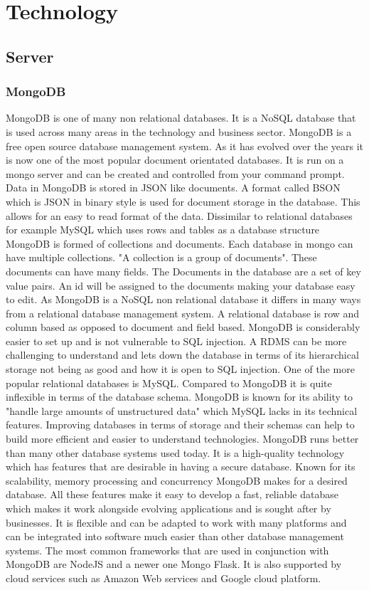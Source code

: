 \section{Technology}
\subsection{Server}
\subsubsection{MongoDB}
MongoDB is one of many non relational databases. It is a NoSQL database that is used across many areas in the technology and business sector. MongoDB is a free open source database management system. As it has evolved over the years it is now one of the most popular document orientated databases. It is run on a mongo server and can be created and controlled from your command prompt. Data in MongoDB is stored in JSON like documents. A format called BSON which is JSON in binary style is used for document storage in the database.\cite{MongoDB} This allows for an easy to read format of the data. Dissimilar to relational databases for example MySQL which uses rows and tables as a database structure MongoDB is formed of collections and documents. Each database in mongo can have multiple collections. "A collection is a group of documents".\cite{MongoDBColections} These documents can have many fields. The Documents in the database are a set of key value pairs. An id will be assigned to the documents making your database easy to edit. As MongoDB is a NoSQL non relational database it differs in many ways from a relational database management system. A relational database is row and column based as opposed to document and field based.\cite{MongoDBColections} MongoDB is considerably easier to set up and is not vulnerable to SQL injection. A RDMS can be more challenging to understand and lets down the database in terms of its hierarchical storage not being as good and how it is open to SQL injection. One of the more popular relational databases is MySQL. Compared to MongoDB it is quite inflexible in terms of the database schema. \cite{MongoDB} MongoDB is known for its ability to "handle large amounts of unstructured data" which MySQL lacks in its technical features. \cite{MongoVsMysql} Improving databases in terms of storage and their schemas can help to build more efficient and easier to understand technologies. MongoDB runs better than many other database systems used today. It is a high-quality technology which has features that are desirable in having a secure database. Known for its scalability, memory processing and concurrency MongoDB makes for a desired database. All these features make it easy to develop a fast, reliable database which makes it work alongside evolving applications and is sought after by businesses. It is flexible and can be adapted to work with many platforms and can be integrated into software much easier than other database management systems. The most common frameworks that are used in conjunction with MongoDB are NodeJS and a newer one Mongo Flask. It is also supported by cloud services such as Amazon Web services and Google cloud platform.

